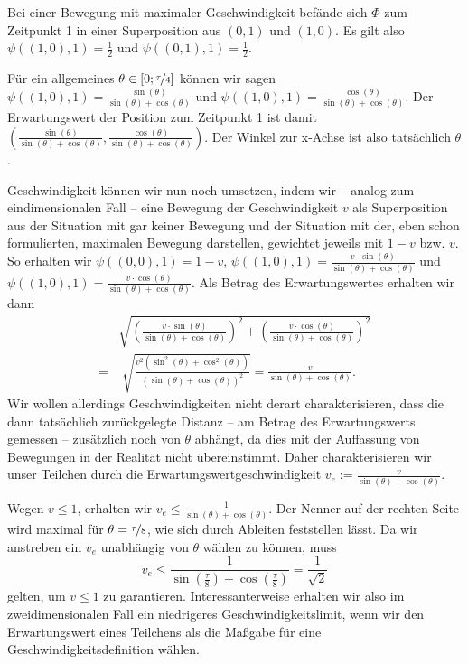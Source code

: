 \documentclass[a4paper,12pt,ngerman]{scrartcl}
\theoremstyle{plain}
\theoremstyle{plain}
\theoremstyle{plain}
\theoremstyle{plain}
\begin{document}
Bei einer Bewegung mit maximaler Geschwindigkeit befände sich $\Phi$ zum Zeitpunkt 1 in einer Superposition aus $(0,1)$ und $(1,0)$. Es gilt also $\psi((1,0),1)=\frac{1}{2}$ und $\psi((0,1),1)=\frac{1}{2}$.

Für ein allgemeines $\theta\in[0;\nicefrac{\tau}{4}]$ können wir sagen $\psi((1,0),1)=\frac{\sin(\theta)}{\sin(\theta)+\cos(\theta)}$ und $\psi((1,0),1)=\frac{\cos(\theta)}{\sin(\theta)+\cos(\theta)}$. Der Erwartungswert der Position zum Zeitpunkt 1 ist damit 
$\left(\frac{\sin(\theta)}{\sin(\theta)+\cos(\theta)},\frac{\cos(\theta)}{\sin(\theta)+\cos(\theta)}\right)$. Der Winkel zur x-Achse ist also tatsächlich $\theta$. 

Geschwindigkeit können wir nun noch umsetzen, indem wir -- analog zum eindimensionalen Fall -- eine Bewegung der Geschwindigkeit $v$ als Superposition aus der Situation mit gar keiner Bewegung und der Situation mit der, eben schon formulierten, maximalen Bewegung darstellen, gewichtet jeweils mit $1-v$ bzw. $v$. So erhalten wir $\psi((0,0),1)=1-v$,\; $\psi((1,0),1)=\frac{v\cdot\sin(\theta)}{\sin(\theta)+\cos(\theta)}$ und $\psi((1,0),1)=\frac{v\cdot\cos(\theta)}{\sin(\theta)+\cos(\theta)}$. Als Betrag des Erwartungswertes erhalten wir dann
\begin{align*}
&\sqrt{\left(\frac{v\cdot\sin(\theta)}{\sin(\theta)+\cos(\theta)}\right)^2+\left(\frac{v\cdot\cos(\theta)}{\sin(\theta)+\cos(\theta)}\right)^2}\\
=&\;\sqrt{\frac{v^2(\sin^2(\theta)+\cos^2(\theta))}{(\sin(\theta)+\cos(\theta))^2}}=\frac{v}{\sin(\theta)+\cos(\theta)}.
\end{align*}
Wir wollen allerdings Geschwindigkeiten nicht derart charakterisieren, dass die dann tatsächlich zurückgelegte Distanz -- am Betrag des Erwartungswerts gemessen -- zusätzlich noch von $\theta$ abhängt, da dies mit der Auffassung von Bewegungen in der Realität nicht übereinstimmt. Daher charakterisieren wir unser Teilchen durch die 
Erwartungswertgeschwindigkeit $v_e:=\frac{v}{\sin(\theta)+\cos(\theta)}.$ 

Wegen $v\leq1$, erhalten wir $v_e\leq\frac{1}{\sin(\theta)+\cos(\theta)}$. Der Nenner auf der rechten Seite wird maximal für $\theta=\nicefrac{\tau}{8}$, wie sich durch Ableiten feststellen lässt. Da wir anstreben ein $v_e$ unabhängig von $\theta$ wählen zu können, muss 
\[v_e\leq\frac{1}{\sin\left(\frac{\tau}{8}\right)+\cos\left(\frac{\tau}{8}\right)}=\frac{1}{\sqrt{2}}\]
gelten, um $v\leq1$ zu garantieren. Interessanterweise erhalten wir also im zweidimensionalen Fall ein niedrigeres Geschwindigkeitslimit, wenn wir den Erwartungswert eines Teilchens als die Maßgabe für eine Geschwindigkeitsdefinition wählen. 
\end{document}
